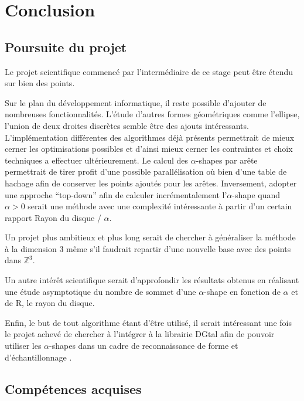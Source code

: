 \section{Conclusion}

\subsection{Poursuite du projet}

Le projet scientifique commencé par l'intermédiaire de ce stage peut être étendu sur bien des points. 

Sur le plan du développement informatique, il reste possible d'ajouter de nombreuses fonctionnalités. L’étude d'autres formes géométriques comme l'ellipse, l'union de deux droites discrètes semble être des ajouts intéressants. L'implémentation différentes des algorithmes déjà présents permettrait de mieux cerner les optimisations possibles et d'ainsi mieux cerner les contraintes et choix techniques a effectuer ultérieurement. Le calcul des $\alpha$-shapes par arête permettrait de tirer profit d'une possible parallélisation où bien d'une table de hachage afin de conserver les points ajoutés pour les arêtes. Inversement, adopter une approche ``top-down'' afin de calculer incrémentalement l'$\alpha$-shape quand $\alpha > 0$ serait une méthode avec une complexité intéressante à partir d'un certain rapport Rayon du disque / $\alpha$.

Un projet plus ambitieux et plus long serait de chercher à généraliser la méthode à la dimension 3 même s'il faudrait repartir d'une nouvelle base avec des points dans $\mathbb{Z}^{3}$. 

Un autre intérêt scientifique serait d'approfondir les résultats obtenus en réalisant une étude asymptotique du nombre de sommet d'une $\alpha$-shape en fonction de $\alpha$ et de R, le rayon du disque.

Enfin, le but de tout algorithme étant d'être utilisé, il serait intéressant une fois le projet achevé de chercher à l'intégrer à la librairie DGtal afin de pouvoir utiliser les $\alpha$-shapes dans un cadre de reconnaissance de forme et d’échantillonnage \cite{BernardiniB97}.


\subsection{Compétences acquises}

